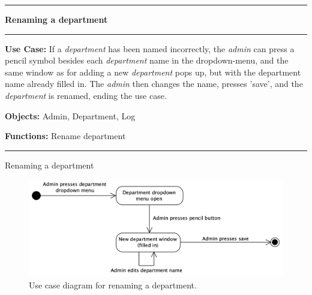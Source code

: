 \begin{use_case}[H]
    \hrule
    \vskip 0.3cm
    \Large
    \begin{center}
    
        \textbf{Renaming a department}
        
    \end{center}
    \vskip 0.1cm
    \hrule
    \vskip 0.2cm
    \normalsize
    
    \textbf{Use Case:} If a \textit{department} has been named incorrectly, the \textit{admin} can press a pencil symbol besides each \textit{department} name in the dropdown-menu, and the same window as for adding a new \textit{department} pops up, but with the department name already filled in. The \textit{admin} then changes the name, presses 'save', and the \textit{department} is renamed, ending the use case.
    
    \vskip 0.2cm
    
    \textbf{Objects:} Admin, Department, Log
    
    \vskip 0.2cm
    
    \textbf{Functions:} Rename department
    
    \vskip 0.4cm
    \hrule
    \vskip 0.2cm
    \caption{Renaming a department} \label{use_case:renaming_a_department}
\end{use_case}

\begin{figure}[H]
    \centering
    \includegraphics[width=1.0\textwidth]{figures/EditDepartment.png}
    \caption{Use case diagram for renaming a department.}
    \label{fig:UseCaseRenameDepartment}
\end{figure}



